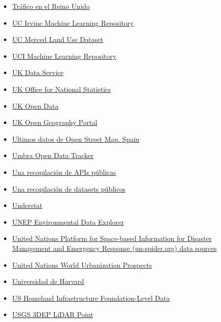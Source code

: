 \documentclass[
  letterpaper,
  DIV=11,
  numbers=noendperiod]{scrartcl}
\begin{document}
\begin{itemize}
  \href{https://github.com/rfordatascience/tidytuesday}{TidyTuesday}
\item
  \href{https://webarchive.nationalarchives.gov.uk/ukgwa/*/http://www.dft.gov.uk/traffic-counts/}{Tráfico
  en el Reino Unido}
\item
  \href{https://archive.ics.uci.edu/datasets}{UC Irvine Machine Learning
  Repository}
\item
  \href{http://weegee.vision.ucmerced.edu/datasets/landuse.html}{UC
  Merced Land Use Dataset}
\item
  \href{http://archive.ics.uci.edu/ml/}{UCI Machine Learning Repository}
\item
  \href{https://ukdataservice.ac.uk/}{UK Data Service}
\item
  \href{https://www.ons.gov.uk/}{UK Office for National Statistics}
\item
  \href{https://data.gov.uk/search}{UK Open Data}
\item
  \href{https://geoportal.statistics.gov.uk/}{UK Open Geography Portal}
\item
  \href{https://download.geofabrik.de/europe/spain.html}{Ultimos datos
  de Open Street Map. Spain}
\item
  \href{https://github.com/bellingcat/umbra-open-data-tracker}{Umbra
  Open Data Tracker}
\item
  \href{https://github.com/toddmotto/public-apis}{Una recopilación de
  APIs públicas}
\item
  \href{https://github.com/caesar0301/awesome-public-datasets}{Una
  recopilación de datasets públicos}
\item
  \href{https://understat.com/}{Understat}
\item
  \href{https://www.unep.org/publications-data}{UNEP Environmental Data
  Explorer}
\item
  \href{https://un-spider.org/links-and-resources/data-sources}{United
  Nations Platform for Space-based Information for Disaster Management
  and Emergency Response (un-spider.org) data sources}
\item
  \href{https://population.un.org/wup/}{United Nations World
  Urbanization Prospects}
\item
  \href{https://dataverse.harvard.edu/}{Universidad de Harvard}
\item
  \href{https://hifld-geoplatform.hub.arcgis.com/}{US Homeland
  Infrastructure Foundation-Level Data}
\item
  \href{https://registry.opendata.aws/usgs-lidar/}{USGS 3DEP LiDAR Point
}
\end{itemize}
\end{document}
